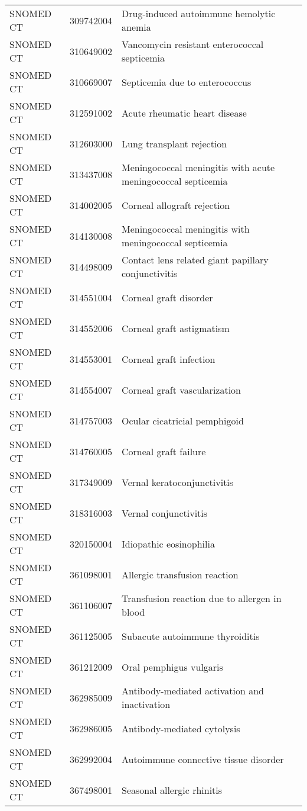 \begin{longtable}{p{}p{}p{}}
  SNOMED CT & 309742004 & Drug-induced autoimmune hemolytic anemia \\ 
  SNOMED CT & 310649002 & Vancomycin resistant enterococcal septicemia \\ 
  SNOMED CT & 310669007 & Septicemia due to enterococcus \\ 
  SNOMED CT & 312591002 & Acute rheumatic heart disease \\ 
  SNOMED CT & 312603000 & Lung transplant rejection \\ 
  SNOMED CT & 313437008 & Meningococcal meningitis with acute meningococcal septicemia \\ 
  SNOMED CT & 314002005 & Corneal allograft rejection \\ 
  SNOMED CT & 314130008 & Meningococcal meningitis with meningococcal septicemia \\ 
  SNOMED CT & 314498009 & Contact lens related giant papillary conjunctivitis \\ 
  SNOMED CT & 314551004 & Corneal graft disorder \\ 
  SNOMED CT & 314552006 & Corneal graft astigmatism \\ 
  SNOMED CT & 314553001 & Corneal graft infection \\ 
  SNOMED CT & 314554007 & Corneal graft vascularization \\ 
  SNOMED CT & 314757003 & Ocular cicatricial pemphigoid \\ 
  SNOMED CT & 314760005 & Corneal graft failure \\ 
  SNOMED CT & 317349009 & Vernal keratoconjunctivitis \\ 
  SNOMED CT & 318316003 & Vernal conjunctivitis \\ 
  SNOMED CT & 320150004 & Idiopathic eosinophilia \\ 
  SNOMED CT & 361098001 & Allergic transfusion reaction \\ 
  SNOMED CT & 361106007 & Transfusion reaction due to allergen in blood \\ 
  SNOMED CT & 361125005 & Subacute autoimmune thyroiditis \\ 
  SNOMED CT & 361212009 & Oral pemphigus vulgaris \\ 
  SNOMED CT & 362985009 & Antibody-mediated activation and inactivation \\ 
  SNOMED CT & 362986005 & Antibody-mediated cytolysis \\ 
  SNOMED CT & 362992004 & Autoimmune connective tissue disorder \\ 
  SNOMED CT & 367498001 & Seasonal allergic rhinitis \\ 

\end{longtable}

